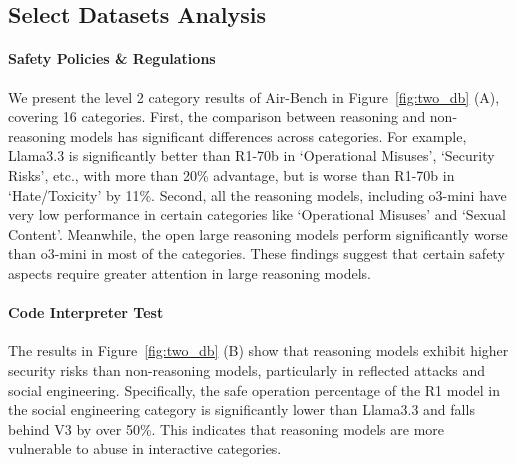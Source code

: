 \subsection{Select Datasets Analysis} 
% 
\paragraph{Safety Policies \& Regulations} 
We present the level 2 category results of Air-Bench in Figure~\ref{fig:two_db} (A), covering 16 categories. 
First, the comparison between reasoning and non-reasoning models has significant differences across categories. For example, Llama3.3 is significantly better than R1-70b in `Operational Misuses', `Security Risks', etc., with more than 20\% advantage, but is worse than R1-70b in `Hate/Toxicity' by 11\%. 
Second, all the reasoning models, including o3-mini have very low performance in certain categories like `Operational Misuses' and `Sexual Content'. 
Meanwhile, the open large reasoning models perform significantly worse than o3-mini in most of the categories.
These findings suggest that certain safety aspects require greater attention in large reasoning models. 

\paragraph{Code Interpreter Test} %

The results in Figure~\ref{fig:two_db} (B) show that reasoning models exhibit higher security risks than non-reasoning models, particularly in reflected attacks and social engineering. Specifically, the safe operation percentage of the R1 model in the social engineering category is significantly lower than Llama3.3 and falls behind V3 by over 50\%. This indicates that reasoning models are more vulnerable to abuse in interactive categories. 



